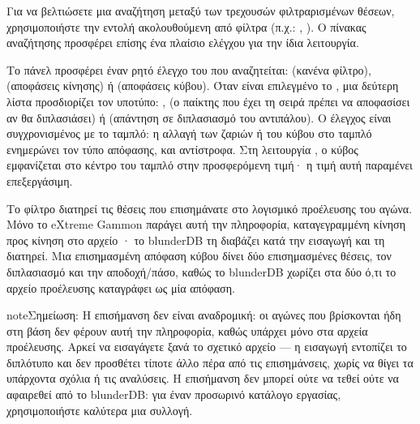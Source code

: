 \documentclass[letterpaper,10pt,greek]{sphinxmanual}
\begin{document}
\sphinxAtStartPar
Για να βελτιώσετε μια αναζήτηση μεταξύ των τρεχουσών φιλτραρισμένων θέσεων, χρησιμοποιήστε την εντολή  ακολουθούμενη από φίλτρα (π.χ.: , ). Ο πίνακας αναζήτησης προσφέρει επίσης ένα πλαίσιο ελέγχου  για την ίδια λειτουργία.

\sphinxAtStartPar
Το πάνελ προσφέρει έναν ρητό έλεγχο του  που αναζητείται:  (κανένα φίλτρο),  (αποφάσεις κίνησης) ή  (αποφάσεις κύβου). Όταν είναι επιλεγμένο το , μια δεύτερη λίστα προσδιορίζει τον υποτύπο: ,  (ο παίκτης που έχει τη σειρά πρέπει να αποφασίσει αν θα διπλασιάσει) ή  (απάντηση σε διπλασιασμό του αντιπάλου). Ο έλεγχος είναι συγχρονισμένος με το ταμπλό: η αλλαγή των ζαριών ή του κύβου στο ταμπλό ενημερώνει τον τύπο απόφασης, και αντίστροφα. Στη λειτουργία , ο κύβος εμφανίζεται στο κέντρο του ταμπλό στην προσφερόμενη τιμή· η τιμή αυτή παραμένει επεξεργάσιμη.

\sphinxAtStartPar
Το φίλτρο  διατηρεί τις θέσεις που επισημάνατε στο λογισμικό προέλευσης του αγώνα. Μόνο το eXtreme Gammon παράγει αυτή την πληροφορία, καταγεγραμμένη κίνηση προς κίνηση στο αρχείο · το blunderDB τη διαβάζει κατά την εισαγωγή και τη διατηρεί. Μια επισημασμένη απόφαση κύβου δίνει δύο επισημασμένες θέσεις, τον διπλασιασμό και την αποδοχή/πάσο, καθώς το blunderDB χωρίζει στα δύο ό,τι το αρχείο προέλευσης καταγράφει ως μία απόφαση.

\begin{sphinxadmonition}{note}{Σημείωση:}
\sphinxAtStartPar
Η επισήμανση δεν είναι αναδρομική: οι αγώνες που βρίσκονται ήδη στη βάση δεν φέρουν αυτή την πληροφορία, καθώς υπάρχει μόνο στα αρχεία προέλευσης. Αρκεί να εισαγάγετε ξανά το σχετικό αρχείο  — η εισαγωγή εντοπίζει το διπλότυπο και δεν προσθέτει τίποτε άλλο πέρα από τις επισημάνσεις, χωρίς να θίγει τα υπάρχοντα σχόλια ή τις αναλύσεις. Η επισήμανση δεν μπορεί ούτε να τεθεί ούτε να αφαιρεθεί από το blunderDB: για έναν προσωρινό κατάλογο εργασίας, χρησιμοποιήστε καλύτερα μια συλλογή.
\end{sphinxadmonition}
\end{document}
